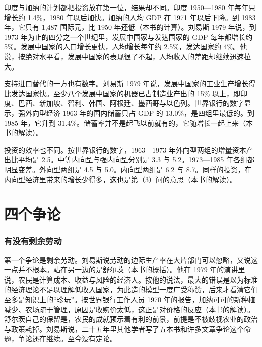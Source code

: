 印度与加纳的计划都把投资放在第一位，结果却不同。印度 1950—1980 年每年只增长约 1.4\%，1980 年以后加快。加纳的人均 GDP 在 1971 年以后下降\cite{mpd2023}。到 1983 年，它只有 1,487 国际元，比 1950 年还低（本书的计算）。刘易斯 1979 年说，到 1973 年为止的四分之一个世纪里，发展中国家与发达国家的 GDP 每年都增长约 5\%\cite{lewis1979}。发展中国家的人口增长更快，人均增长每年约 2.5\%，发达国家约 4\%\cite{lewis1979}。他说，按绝对水平看，发展中国家的表现很了不起，人均收入的差距却继续迅速拉大\cite{lewis1979}。

支持进口替代的一方也有数字。刘易斯 1979 年说，发展中国家的工业生产增长得比发达国家快\cite{lewis1979}。至少八个发展中国家的机器已占制造业产出的 15\% 以上，即印度、巴西、新加坡、智利、韩国、阿根廷、墨西哥与以色列\cite{lewis1979}。世界银行的数字显示，强外向型经济 1963 年的国内储蓄只占 GDP 的 13.0\%，是四组里最低的\cite{wdr1987}。到 1985 年，它升到 31.4\%。储蓄率并不是起飞以前就有的，它随增长一起上来（本书的解读）。

投资的效率也不同。按世界银行的数字，1963—1973 年外向型两组的增量资本产出比平均是 2.5\cite{wdr1987}。中等内向型与强内向型分别是 3.3 与 5.2。1973—1985 年各组都明显变差\cite{wdr1987}。外向型两组是 4.5 与 5.0。内向型两组是 6.2 与 8.7。同样的投资，在内向型经济里带来的增长少得多，这也是第（3）问的意思（本书的解读）。


\section{四个争论}\label{sec:development-debate}

\subsubsection{有没有剩余劳动}

第一个争论是剩余劳动。刘易斯说劳动的边际生产率在大片部门可以忽略，又说这一点并不根本\cite{lewis1954}。站在另一边的是舒尔茨（本书的概括）。他在 1979 年的演讲里说，农民是计算成本、收益与风险的经济人\cite{schultz1979}。按他的说法，最大的错误是以为标准的经济理论不足以理解低收入国家，为此造的模型一度广受称赞，后来才看清它们至多是知识上的“珍玩”\cite{schultz1979}。按世界银行工作人员 1970 年的报告，加纳可可的新种植减少、农场疏于管理，原因是收购价太低\cite{wbcocoa1970}，这正是对价格的反应（本书的解读）。舒尔茨自己的保留是，农民的成就预示着有利的前景，前提是不被歧视农业的政治与政策耗掉\cite{schultz1979}。刘易斯说，二十五年里其他学者写了五本书和许多文章争论这个命题，争论还在继续\cite{lewisbio1979}。至今没有定论。

